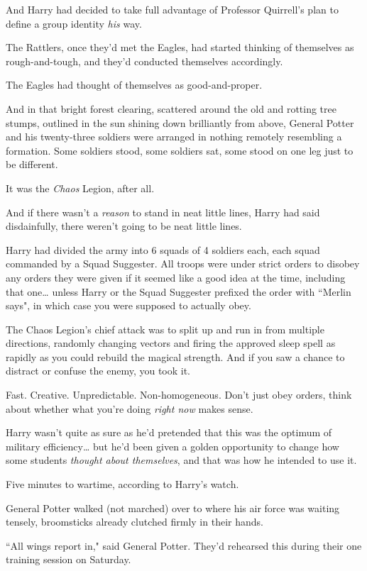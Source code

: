And Harry had decided to take full advantage of Professor Quirrell's plan to define a group identity \emph{his} way.

The Rattlers, once they'd met the Eagles, had started thinking of themselves as rough-and-tough, and they'd conducted themselves accordingly.

The Eagles had thought of themselves as good-and-proper.

And in that bright forest clearing, scattered around the old and rotting tree stumps, outlined in the sun shining down brilliantly from above, General Potter and his twenty-three soldiers were arranged in nothing remotely resembling a formation. Some soldiers stood, some soldiers sat, some stood on one leg just to be different.

It was the \emph{Chaos} Legion, after all.

And if there wasn't a \emph{reason} to stand in neat little lines, Harry had said disdainfully, there weren't going to be neat little lines.

Harry had divided the army into 6 squads of 4 soldiers each, each squad commanded by a Squad Suggester. All troops were under strict orders to disobey any orders they were given if it seemed like a good idea at the time, including that one{\ldots} unless Harry or the Squad Suggester prefixed the order with ``Merlin says", in which case you were supposed to actually obey.

The Chaos Legion's chief attack was to split up and run in from multiple directions, randomly changing vectors and firing the approved sleep spell as rapidly as you could rebuild the magical strength. And if you saw a chance to distract or confuse the enemy, you took it.

Fast. Creative. Unpredictable. Non-homogeneous. Don't just obey orders, think about whether what you're doing \emph{right now} makes sense.

Harry wasn't quite as sure as he'd pretended that this was the optimum of military efficiency{\ldots} but he'd been given a golden opportunity to change how some students \emph{thought about themselves}, and that was how he intended to use it.

Five minutes to wartime, according to Harry's watch.

General Potter walked (not marched) over to where his air force was waiting tensely, broomsticks already clutched firmly in their hands.

``All wings report in," said General Potter. They'd rehearsed this during their one training session on Saturday.

